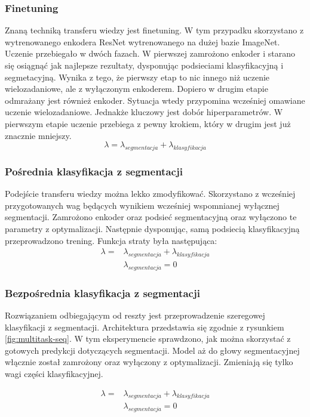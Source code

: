 \subsubsection{Finetuning}
Znaną techniką transferu wiedzy jest finetuning. W tym przypadku skorzystano z wytrenowanego enkodera ResNet wytrenowanego na dużej bazie ImageNet. Uczenie przebiegało w dwóch fazach. W pierwszej zamrożono enkoder i starano się osiągnąć jak najlepsze rezultaty, dysponując podsieciami klasyfikacyjną i segmetacyjną. Wynika z tego, że pierwszy etap to nic innego niż uczenie wielozadaniowe, ale z wyłączonym enkoderem. Dopiero w drugim etapie odmrażany jest również enkoder. Sytuacja wtedy przypomina wcześniej omawiane uczenie wielozadaniowe. Jednakże kluczowy jest dobór hiperparametrów. W pierwszym etapie uczenie przebiega z pewny krokiem, który w drugim jest już znacznie mniejszy.
\begin{equation*}
\lambda = \lambda_{segmentacja} + \lambda_{klasyfikacja}
\end{equation*}
\subsubsection{Pośrednia klasyfikacja z segmentacji}
Podejście transferu wiedzy można lekko zmodyfikować. Skorzystano z wcześniej przygotowanych wag będących wynikiem wcześniej wspomnianej wyłącznej segmentacji. Zamrożono enkoder oraz podsieć segmentacyjną oraz wyłączono te parametry z optymalizacji. Następnie dysponując, samą podsiecią klasyfikacyjną przeprowadzono trening. Funkcja straty była następująca:
\begin{align*}
\lambda  = & \lambda_{segmentacja} + \lambda_{klasyfikacja} \\
           & \lambda_{segmentacja} = 0
\end{align*}
\subsubsection{Bezpośrednia klasyfikacja z segmentacji}
Rozwiązaniem odbiegającym od reszty jest przeprowadzenie szeregowej klasyfikacji z segmentacji. Architektura przedstawia się zgodnie z rysunkiem \ref{fig:multitask-seq}. W tym eksperymencie sprawdzono, jak można skorzystać z gotowych predykcji dotyczących segmentacji. Model aż do głowy segmentacyjnej włącznie został zamrożony oraz wyłączony z optymalizacji. Zmieniają się tylko wagi części klasyfikacyjnej.

\begin{align*}
\lambda  = & \lambda_{segmentacja} + \lambda_{klasyfikacja} \\
           & \lambda_{segmentacja} = 0
\end{align*}





